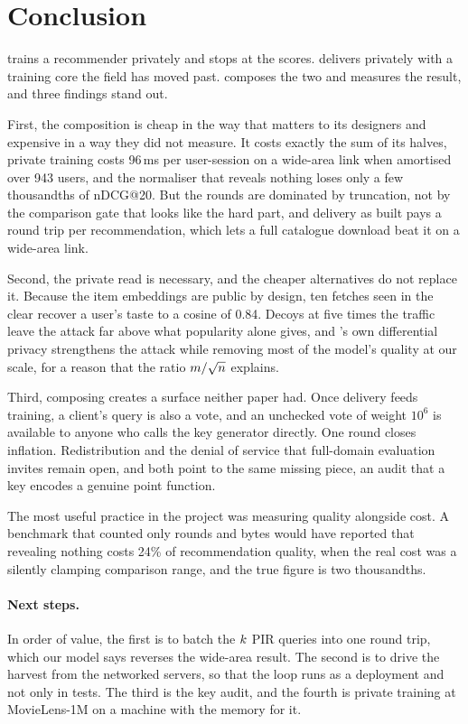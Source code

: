 \section{Conclusion}
\label{sec:conclusion}

\nudgeplain{} trains a recommender privately and stops at the scores.
\pirsonaplain{} delivers privately with a training core the field has moved past.
\sys{} composes the two and measures the result, and three findings stand out.

First, the composition is cheap in the way that matters to its designers and
expensive in a way they did not measure. It costs exactly the sum of its halves,
private training costs 96\,ms per user-session on a wide-area link when amortised
over 943 users, and the normaliser that reveals nothing loses only a few
thousandths of nDCG@20. But the rounds are dominated by truncation, not by the
comparison gate that looks like the hard part, and delivery as built pays a round
trip per recommendation, which lets a full catalogue download beat it on a
wide-area link.

Second, the private read is necessary, and the cheaper alternatives do not
replace it. Because the item embeddings are public by design, ten fetches seen in
the clear recover a user's taste to a cosine of 0.84. Decoys at five times the
traffic leave the attack far above what popularity alone gives, and
\nudgeplain{}'s own differential privacy strengthens the attack while removing
most of the model's quality at our scale, for a reason that the ratio
$m/\sqrt{n}$ explains.

Third, composing creates a surface neither paper had. Once delivery feeds
training, a client's query is also a vote, and an unchecked vote of weight $10^6$
is available to anyone who calls the key generator directly. One round closes
inflation. Redistribution and the denial of service that full-domain evaluation
invites remain open, and both point to the same missing piece, an audit that a
key encodes a genuine point function.

The most useful practice in the project was measuring quality alongside cost.
A benchmark that counted only rounds and bytes would have reported that
revealing nothing costs 24\% of recommendation quality, when the real cost was a
silently clamping comparison range, and the true figure is two thousandths.

\paragraph{Next steps.} In order of value, the first is to batch the $k$ PIR
queries into one round trip, which our model says reverses the wide-area result.
The second is to drive the harvest from the networked servers, so that the loop
runs as a deployment and not only in tests. The third is the key audit, and the
fourth is private training at MovieLens-1M on a machine with the memory for it.
